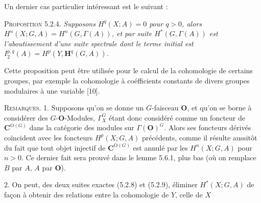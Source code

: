 Un dernier cas particulier intéressant est le suivant :

\textsc{Proposition 5.2.4.} \textit{Supposons $H^q(X;A)=0$ pour
$q>0$, alors $H^n(X;G,A)=H^n(G,\Gamma(A))$, et par suite
$H^*(G,\Gamma(A))$ est l'aboutissement d'une suite spectrale dont le terme
initial est $I_2^{p,q}(A)=H^p(Y,\mathbf H^q(G,A))$.}

Cette proposition peut être utilisée pour le calcul de la cohomologie de
certains groupes, par exemple la cohomologie à coéfficients constants de
divers groupes modulaires à une variable [10].

\textsc{Remarques. 1.} Supposons qu'on se donne un $G$-faisceau
${\mathbf O}$, et qu'on se borne à considérer des $G$-${\mathbf O}$-Modules, $\Gamma_X^G$ étant
donc considéré comme un foncteur de ${\mathbf C}^{\mathrm O(G)}$ dans la catégorie des modules
sur $\Gamma({\mathbf O})^G$. Alors ses foncteurs dérivés coïncident avec les foncteurs
$H^p(X;G,A)$ précédents, comme il résulte aussitôt du fait que tout objet
injectif de ${\mathbf C}^{\mathrm O(G)}$ est annulé par les $H^n(X;G,A)$ pour $n>0$. Ce dernier
fait sera prouvé dans le lemme 5.6.1, plus bas (où on remplace $B$ par $A$, $A$
par ${\mathbf O}$).

2. On peut, des deux suites exactes (5.2.8) et (5.2.9), éliminer
$H^*(X;G,A)$ de façon à obtenir des relations entre la cohomologie de $Y$,
celle de $X$

